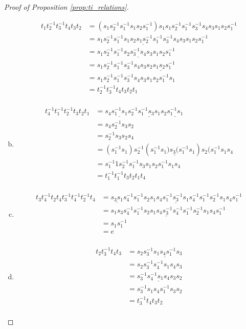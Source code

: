 \documentclass[11pt]{amsart}
\theoremstyle{definition}
\begin{document}
\begin{proof}[Proof of Proposition \ref{prop:ti_relations}]
\begin{enumerate}[a)]
\begin{align*}
t_1t_2^{-1}t_3^{-1}t_4t_3t_2 &= (s_1s_2^{-1}s_1^{-1}s_1s_2s_1^{-1})s_1s_1s_2^{-1}s_1^{-1}s_3^{-1}s_4s_3s_1s_2s_1^{-1}\\
&= s_1s_2^{-1}s_1^{-1}\underline{s_1s_2s_1s_2^{-1}s_1^{-1}}s_3^{-1}s_4s_3s_1s_2s_1^{-1}\\
&= s_1s_2^{-1}s_1^{-1}\underline{s_2s_3^{-1}s_4s_3}s_1s_2s_1^{-1}\\
&= s_1s_2^{-1}s_1^{-1}s_3^{-1}s_4s_3\underline{s_2s_1s_2s_1^{-1}}\\
&= s_1s_2^{-1}s_1^{-1}s_3^{-1}s_4s_3s_1s_2s_1^{-1}s_1\\
&= t_2^{-1}t_3^{-1}t_4t_3t_2t_1\\
\end{align*}

\item
\begin{align*}
t_4^{-1}t_1^{-1}t_2^{-1}t_3t_2t_1 &= s_4\underline{s_1^{-1}s_1}s_2^{-1}\underline{s_1^{-1}s_3s_1}s_2 \underline{s_1^{-1}s_1}\\
&= s_4s_2^{-1}s_3s_2\\
&= s_2^{-1}s_3s_2s_4\\
&= (s_1^{-1}s_1)s_2^{-1}(s_1^{-1}\underline{s_1)s_3(s_1^{-1}}s_1)s_2(s_1^{-1}s_1s_4\\
&= s_1^{-1}1s_2^{-1}s_1^{-1}s_3s_1s_2s_1^{-1}s_1s_4\\
&= t_1^{-1}t_1^{-1}t_3t_2t_1t_4\\
\end{align*}

\item
\begin{align*}
t_3t_4^{-1}t_2t_4t_3^{-1}t_4^{-1}t_2^{-1}t_4 &= \underline{s_3s_1}s_4^{-1}s_1^{-1}s_2s_1s_4\underline{s_1^{-1}s_3^{-1}s_1}s_4^{-1}s_1^{-1}s_2^{-1}s_1s_4s_1^{-1}\\
&= s_1\underline{s_3s_4^{-1}s_1^{-1}s_2s_1s_4s_3^{-1}s_4^{-1}s_1^{-1}s_2^{-1}s_1s_4}s_1^{-1}\\
&= s_1s_1^{-1}\\
&= e\\
\end{align*}

\item
\begin{align*}
t_2t_3^{-1}t_4t_3 &= s_2s_3^{-1}\underline{s_1s_4s_1^{-1}}s_3\\
&= s_2s_3^{-1}s_4^{-1}s_1s_4s_3\\
&= s_3^{-1}\underline{s_4^{-1}s_1s_4}s_3s_2\\
&= s_3^{-1}s_1s_4s_1^{-1}s_3s_2\\
&= t_3^{-1}t_4t_3t_2\\
\end{align*}


\end{enumerate}
\end{proof}
\end{document}
